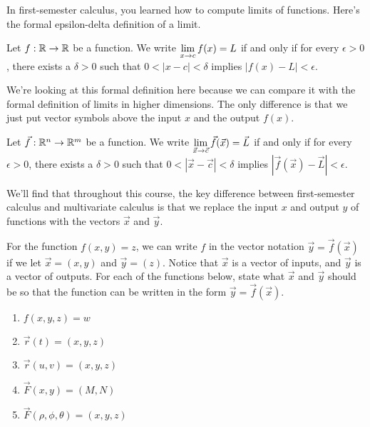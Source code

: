 In first-semester calculus, you learned how to compute limits of functions. Here's the formal epsilon-delta definition of a limit. 
\begin{definition}
 Let $f:\mathbb{R}\to\mathbb{R}$ be a function.
 We write $\displaystyle \lim_{x\to c} f(x)=L$ if and only if for every $\epsilon>0$, there exists a $\delta>0$ such that $0<|x-c|<\delta$ implies $|f(x)-L|<\epsilon$.
\end{definition}
 We're looking at this formal definition here because we can compare it with the formal definition of limits in higher dimensions. The only difference is that we just put vector symbols above the input $x$ and the output $f(x)$.
\begin{definition}
 Let $\vec f:\mathbb{R}^n\to\mathbb{R}^m$ be a function.
 We write $\displaystyle \lim_{\vec x\to \vec c} \vec f(\vec x)=\vec L$ if and only if for every $\epsilon>0$, there exists a $\delta>0$ such that $0<|\vec x-\vec c|<\delta$ implies $|\vec f(\vec x)-\vec L|<\epsilon$.
\end{definition}
We'll find that throughout this course, the key difference between first-semester calculus and multivariate calculus is that we replace the input $x$ and output $y$ of functions with the vectors $\vec x$ and $\vec y$. 
 
\begin{problem}
 For the function $f(x,y)=z$, we can write $f$ in the vector notation $\vec y=\vec f(\vec x)$ if we let $\vec x=(x,y)$ and $\vec y=(z)$. Notice that $\vec x$ is a vector of inputs, and $\vec y$ is a vector of outputs. 
 For each of the functions below, state what $\vec x$ and $\vec y$ should be so that the function can be written in the form $\vec y = \vec f (\vec x)$.   
\begin{enumerate}
 \item $f(x,y,z)=w$
 \item $\vec r(t)=(x,y,z)$
 \item $\vec r(u,v)=(x,y,z)$
 \item $\vec F(x,y)=(M,N)$
 \item $\vec F(\rho,\phi,\theta)=(x,y,z)$
\end{enumerate}
\end{problem}


